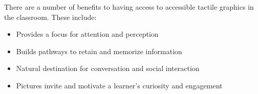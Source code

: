 \documentclass[14pt,letterpaper,twoside]{extreport}
\begin{document}
There are a number of benefits to having access to accessible tactile graphics in the classroom. These include:
\begin{itemize}[leftmargin=*]
\item Provides a focus for attention and perception
\item Builds pathways to retain and memorize information
\item Natural destination for conversation and social interaction
\item Pictures invite and motivate a learner's curiosity and engagement
\end{itemize}
\begin{longtable}[]{@{}
	>{\raggedright\arraybackslash}m{}
	>{\raggedright\arraybackslash}m{}
	>{\raggedright\arraybackslash}b{}@{}
	}
	\toprule


\end{longtable}
\end{document}
